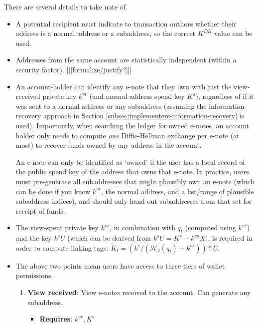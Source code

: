 There are several details to take note of.

\begin{itemize}
    \item A potential recipient must indicate to transaction authors whether their address is a normal address or a subaddress, so the correct $K^{DH}$ value can be used.

    \item Addresses from the same account are statistically independent (within a security factor). [[[formalize/justify?]]]

    \item An account-holder can identify any e-note that they own with just the view-received private key $k^{vr}$ (and normal address spend key $K^s$), regardless of if it was sent to a normal address or any subaddress (assuming the information-recovery approach in Section \ref{subsec:implementers-information-recovery} is used). Importantly, when searching the ledger for owned e-notes, an account holder only needs to compute {\em one} Diffie-Hellman exchange per e-note (at most) to recover funds owned by any address in the account.

    An e-note can only be identified as `owned' if the user has a local record of the public spend key of the address that owns that e-note. In practice, users must pre-generate all subaddresses that might plausibly own an e-note (which can be done if you know $k^{vr}$, the normal address, and a list/range of plausible subaddress indices), and should only hand out subaddresses from that set for receipt of funds.

    \item The view-spent private key $k^{vs}$, in combination with $q_t$ (computed using $k^{vr}$) and the key $k^s U$ (which can be derived from $k^s U = K^s - k^{vs} X)$, is required in order to compute linking tags: $\tilde{K}_t = (k^s/(\mathcal{H}_2(q_t) + k^{vs}))*U$.

    \item The above two points mean users have access to three tiers of wallet permissions.

    \begin{enumerate}
        \item \textbf{View received}: View e-notes received to the account. Can generate any subaddress.
        \begin{itemize}
            \item \textbf{Requires}: $k^{vr}, K^s$
        \end{itemize}


\end{enumerate}
\end{itemize}
